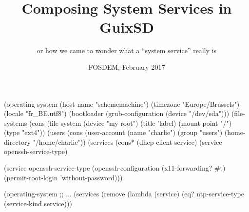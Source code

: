 \documentclass{beamer}
\title{Composing System Services in GuixSD}
\subtitle{or how we came to wonder what a ``system service'' really is}
\date{\small{FOSDEM, February 2017}}
\begin{document}
\maketitle


\begin{frame}[plain]
\end{frame}

\begin{frame}[fragile]
  \begin{semiverbatim}
    \small{
(\alert{operating-system}
  (host-name "schememachine")
  (timezone "Europe/Brussels")
  (locale "fr_BE.utf8")
  (bootloader (grub-configuration (device "/dev/sda")))
  (file-systems (cons (\alert{file-system}
                        (device "my-root")
                        (title 'label)
                        (mount-point "/")
                        (type "ext4"))
  (users (cons (\alert{user-account}
                 (name "charlie")
                 (group "users")
                 (home-directory "/home/charlie"))
  (services (cons* (dhcp-client-service)
                   (service openssh-service-type)
    }
  \end{semiverbatim}
\end{frame}

\begin{frame}[fragile]
  \begin{semiverbatim}
  (service openssh-service-type
           (openssh-configuration
             (x11-forwarding? #t)
             (permit-root-login 'without-password)))
  \end{semiverbatim}
\end{frame}

\begin{frame}[fragile]
  \begin{semiverbatim}
(\alert{operating-system}
  ;; \textrm{...}
  (services (remove (lambda (service)
                      (eq? ntp-service-type
                           (service-kind service)))
  \end{semiverbatim}
\end{frame}
\end{document}
